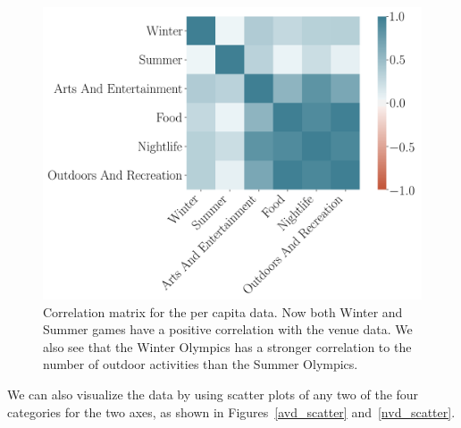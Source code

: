 \documentclass[
 reprint,
 amsmath,amssymb,
 aps,
prb,
floatfix
]{revtex4-2}
\begin{document}
    \begin{figure}[htb]
        \centering
        \includegraphics[width=\columnwidth]{../figures/correlation_percapita.png}
        \caption{Correlation matrix for the per capita data. Now both Winter and Summer games have a positive correlation with the venue data. We also see that the Winter Olympics has a stronger correlation to the number of outdoor activities than the Summer Olympics.}
        \label{corr_percapita}
    \end{figure}
    We can also visualize the data by using scatter plots of any two of the four categories for the two axes, as shown in Figures~\ref{avd_scatter} and~\ref{nvd_scatter}.
\end{document}
